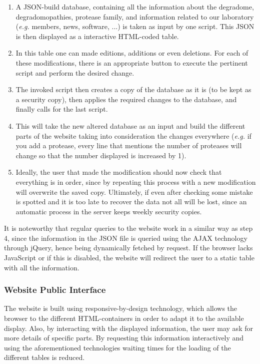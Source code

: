 \begin{enumerate}[topsep=1ex,itemsep=-1ex]
	\item A JSON-build database, containing all the information about the degradome, degradomopathies, protease family, and information related to our laboratory (\textit{e.g.} members, news, software, ...) is taken as input by one script. This JSON is then displayed as a interactive HTML-coded table.
	\item In this table one can made editions, additions or even deletions. For each of these modifications, there is an appropriate button to execute the pertinent script and perform the desired change.
	\item The invoked script then creates a copy of the database as it is (to be kept as a security copy), then applies the required changes to the database, and finally calls for the last script.
	\item This will take the new altered database as an input and build the different parts of the website taking into consideration the changes everywhere (\textit{e.g.} if you add a protease, every line that mentions the number of proteases will change so that the number displayed is increased by 1).
	\item Ideally, the user that made the modification should now check that everything is in order, since by repeating this process with a new modification will overwrite the saved copy. Ultimately, if even after checking some mistake is spotted and it is too late to recover the data not all will be lost, since an automatic process in the server keeps weekly security copies.
\end{enumerate}

It is noteworthy that regular queries to the website work in a similar way as step 4, since the information in the JSON file is queried using the AJAX technology through jQuery, hence being dynamically fetched by request. If the browser lacks JavaScript or if this is disabled, the website will redirect the user to a static table with all the information.

\subsubsection*{Website Public Interface}

The website is built using responsive-by-design technology, which allows the browser to  the different HTML-containers in order to adapt it to the available display.
Also, by interacting with the displayed information, the user may ask for more details of specific parts.
By requesting this information interactively and using the aforementioned technologies waiting times for the loading of the different tables is reduced.

